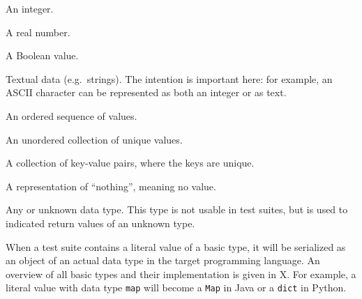 \documentclass[../main]{subfiles}
\begin{document}
\begin{description}[noitemsep]
    \item[\texttt{integer}] An integer.
    \item[\texttt{real}] A real number.
    \item[\texttt{boolean}] A Boolean value.
    \item[\texttt{text}] Textual data (e.g.\ strings). The intention is important here: for example, an \textsc{ASCII} character can be represented as both an integer or as text.
    \item[\texttt{sequence}] An ordered sequence of values.
    \item[\texttt{set}] An unordered collection of unique values.
    \item[\texttt{map}] A collection of key-value pairs, where the keys are unique.
    \item[\texttt{nothing}] A representation of ``nothing'', meaning no value.
    \item[\texttt{any}]  Any or unknown data type. This type is not usable in test suites, but is used to indicated return values of an unknown type.
\end{description}

When a test suite contains a literal value of a basic type, it will be serialized as an object of an actual data type in the target programming language.
An overview of all basic types and their implementation is given in X.
For example, a literal value with data type \texttt{map} will become a \texttt{Map} in Java or a \texttt{dict} in Python.
\end{document}
